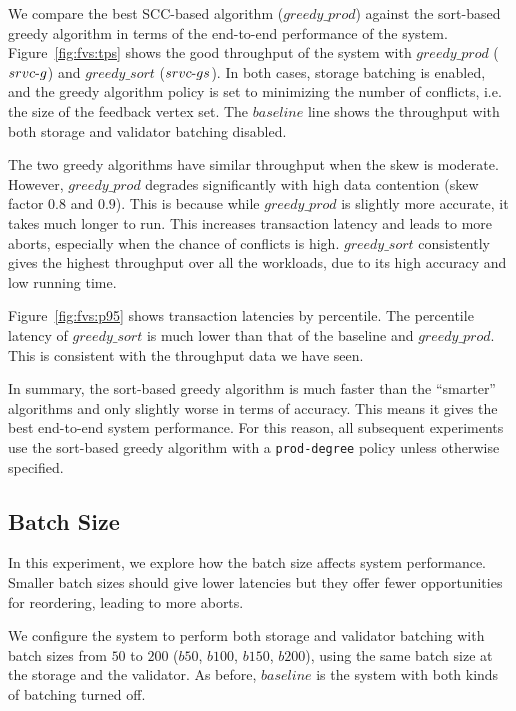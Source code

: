 We compare the best SCC-based algorithm ($greedy\_prod$) against the sort-based greedy algorithm in terms of the end-to-end performance of the system. Figure~\ref{fig:fvs:tps} shows the good throughput of the system with $greedy\_prod$ ($srvc\hbox{-}g$) and $greedy\_sort$ ($srvc\hbox{-}gs$). In both cases, storage batching is enabled, and the greedy algorithm policy is set to minimizing the number of conflicts, i.e. the size of the feedback vertex set. The $baseline$ line shows the throughput with both storage and validator batching disabled. 



The two greedy algorithms have similar throughput when the skew is moderate. However,  $greedy\_prod$ degrades significantly with high data contention (skew factor $0.8$ and $0.9$). This is because while $greedy\_prod$ is slightly more accurate, it takes much longer to run. This increases transaction latency and leads to more aborts, especially when the chance of conflicts is high. $greedy\_sort$ consistently gives the highest throughput over all the workloads, due to its high accuracy and low running time. 

Figure~\ref{fig:fvs:p95} shows transaction latencies by percentile. The percentile latency of $greedy\_sort$ is much lower than that of the baseline and $greedy\_prod$. This is consistent with the throughput data we have seen.

In summary, the sort-based greedy algorithm is much faster than the ``smarter'' algorithms and only slightly worse in terms of accuracy. This means it gives the best end-to-end system performance. For this reason, all subsequent experiments use the sort-based greedy algorithm with a \texttt{prod-degree} policy unless otherwise specified.


\subsection{Batch Size}

In this experiment, we explore how the batch size affects system performance. Smaller batch sizes should give lower latencies but they offer fewer opportunities for reordering, leading to more aborts. 

We configure the system to perform both storage and validator batching with batch sizes from $50$ to $200$ ($b50$, $b100$, $b150$, $b200$), using the same batch size at the storage and the validator. As before, $baseline$ is the system with both kinds of batching turned off. 

